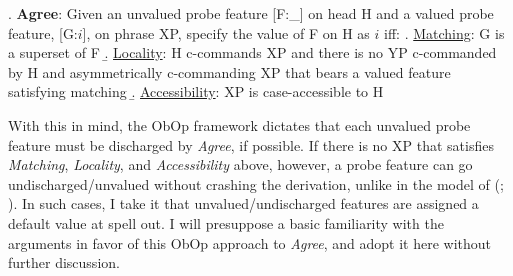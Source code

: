 \documentclass[11pt, letterpaper]{paper_nick}
\begin{document}
\ex. \textbf{Agree}:
Given an unvalued probe feature [F:\_] on head H and a valued probe feature, [G:$i$], on phrase XP, specify the value of F on H as $i$ iff:
\a. \underline{Matching}: G is a superset of F
\b. \underline{Locality}: H c-commands XP and there is no YP c-commanded by H and asymmetrically c-commanding XP that bears a valued feature satisfying matching
\b. \underline{Accessibility}: XP is case-accessible to H 

With this in mind, the ObOp framework dictates that each unvalued probe feature must be discharged by \emph{Agree}, if possible. If there is no XP that satisfies \emph{Matching}, \emph{Locality}, and \emph{Accessibility} above, however, a probe feature can go undischarged/unvalued without crashing the derivation, unlike in the model of \citeauthor{chomsky00} (\citeyear{chomsky00}; \citeyear{chomsky01}). In such cases, I take it that unvalued/undischarged features are assigned a default value at spell out. I will presuppose a basic familiarity with the arguments in favor of this ObOp approach to \emph{Agree}, and adopt it here without further discussion. 
\end{document}

